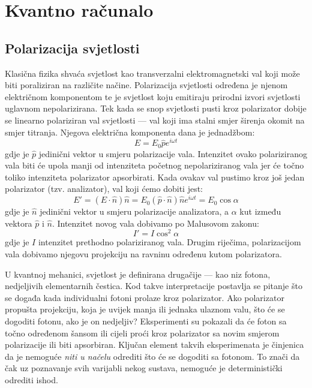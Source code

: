\chapter{Kvantno računalo}

\section{Polarizacija svjetlosti}

Klasična fizika shvaća svjetlost kao transverzalni elektromagnetski val koji može biti poraliziran na različite načine. Polarizacija svjetlosti određena je njenom električnom komponentom te je svjetlost koju emitiraju prirodni izvori svjetlosti uglavnom nepolarizirana. Tek kada se snop svjetlosti pusti kroz polarizator dobije se linearno polariziran val svjetlosti --- val koji ima stalni smjer širenja okomit na smjer titranja. Njegova električna komponenta dana je jednadžbom:
\begin{equation}
E = E_0 \hat{p}e^{i\omega t}
\end{equation}
gdje je $\hat{p}$ jedinični vektor u smjeru polarizacije vala. Intenzitet ovako polariziranog vala biti će upola manji od intenziteta početnog nepolariziranog vala jer će točno toliko intenziteta polarizator apsorbirati. Kada ovakav val pustimo kroz još jedan polarizator (tzv. analizator), val koji ćemo dobiti jest:
\begin{equation}
E' = (E \cdot \hat{n}) \hat{n} = E_0 (\hat{p} \cdot \hat{n})\hat{n}e^{i\omega t} = E_0 \cos \alpha
\end{equation}
gdje je $\hat{n}$ jedinični vektor u smjeru polarizacije analizatora, a $\alpha$ kut između vektora $\hat{p}$ i $\hat{n}$. Intenzitet novog vala dobivamo po Malusovom zakonu:
\begin{equation}
I' = I \cos^2 \alpha
\end{equation}
gdje je $I$ intenzitet prethodno polariziranog vala. Drugim riječima, polarizacijom vala dobivamo njegovu projekciju na ravninu određenu kutom polarizatora. 

U kvantnoj mehanici, svjetlost je definirana drugačije --- kao niz fotona, nedjeljivih elementarnih čestica. Kod takve interpretacije postavlja se pitanje što se događa kada individualni fotoni prolaze kroz polarizator. Ako polarizator propušta projekciju, koja je uvijek manja ili jednaka ulaznom valu, što će se dogoditi fotonu, ako je on nedjeljiv? Eksperimenti su pokazali da će foton sa točno određenom šansom ili cijeli proći kroz polarizator sa novim smjerom polarizacije ili biti apsorbiran. Ključan element takvih eksperimenata je činjenica da je nemoguće \emph{niti u načelu} odrediti što će se dogoditi sa fotonom. To znači da čak uz poznavanje svih varijabli nekog sustava, nemoguće je deterministički odrediti ishod.

